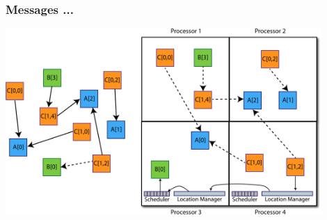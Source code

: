 \begin{frame}
  \frametitle{Messages ...
  }
  \begin{center}\includegraphics[width=0.9\textwidth]{../figures/elements2.pdf}\end{center}
\end{frame}
